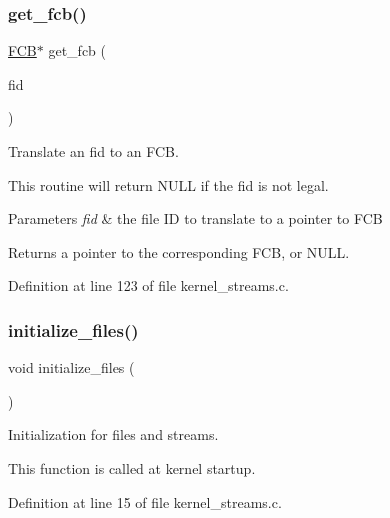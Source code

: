 \subsubsection{\texorpdfstring{get\+\_\+fcb()}{get\_fcb()}}
{\footnotesize\ttfamily \hyperlink{group__streams_ga0c7e751afb9d6cadebf070961804d400}{F\+CB}$\ast$ get\+\_\+fcb (\begin{DoxyParamCaption}\item[{\hyperlink{group__syscalls_ga5097222c5f0da97d92d4712359abc38f}{Fid\+\_\+t}}]{fid }\end{DoxyParamCaption})}



Translate an fid to an F\+CB. 

This routine will return N\+U\+LL if the fid is not legal.


\begin{DoxyParams}{Parameters}
{\em fid} & the file ID to translate to a pointer to F\+CB \\
\hline
\end{DoxyParams}
\begin{DoxyReturn}{Returns}
a pointer to the corresponding F\+CB, or N\+U\+LL. 
\end{DoxyReturn}


Definition at line 123 of file kernel\+\_\+streams.\+c.

\mbox{\label{group__streams_ga147537248d983b0cc6cc7e8b39245f09}} 
\subsubsection{\texorpdfstring{initialize\+\_\+files()}{initialize\_files()}}
{\footnotesize\ttfamily void initialize\+\_\+files (\begin{DoxyParamCaption}{ }\end{DoxyParamCaption})}



Initialization for files and streams. 

This function is called at kernel startup. 

Definition at line 15 of file kernel\+\_\+streams.\+c.

